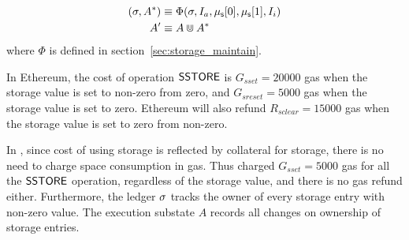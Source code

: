 \begin{align}
	(\mathbf{\sigma}, A^*)   &\equiv \Phi(\mathbf{\sigma},I_a, \mathbf{\mu}_{\sf s}[0],\mathbf{\mu}_{\sf s}[1],I_i) \\ 
	A' &\equiv A\Cup A^*
\end{align}
%
%
where $\Phi$ is defined in section~\ref{sec:storage_maintain}.

In Ethereum, the cost of operation $\mathsf{SSTORE}$ is $G_{sset}=20000$ gas when the storage value is set to non-zero from zero,
and  $G_{sreset}=5000$ gas when the storage value is set to zero. 
Ethereum will also refund $R_{sclear}=15000$ gas when the storage value is set to zero from non-zero. 

In {\name}, since cost of using storage is reflected by collateral for storage, there is no need to charge space consumption in gas. 
Thus {\name} charged $G_{sset}=5000$ gas for all the $\mathsf{SSTORE}$ operation, 
regardless of the storage value,
and there is no gas refund either. 
Furthermore, the {\name} ledger $\mathbf{\sigma}$ tracks the owner of every storage entry with non-zero value. 
The execution substate $A$ records all changes on ownership of storage entries. 

